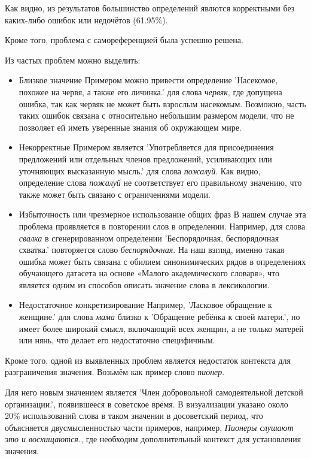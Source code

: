 \documentclass[LI,VKR]{HSEUniversity}
\begin{document}
Как видно, из результатов большинство определений явлются корректными
без каких-либо ошибок или недочётов (61.95\%).

Кроме того, проблема с самореференцией была успешно решена.

Из частых проблем можно выделить:
\begin{itemize}
    \item Близкое значение
Примером можно привести определение ’Насекомое, похожее на червя, а также его личинка.’
для слова \textit{червяк},
где допущена ошибка, так как червяк не может быть взрослым насекомым.
Возможно, часть таких ошибок связана с относительно небольшим размером модели,
что не позволяет ей иметь уверенные знания об окружающем мире.

    \item Некорректные
Примером является ’Употребляется для присоединения предложений или отдельных членов предложений,
усиливающих или уточняющих высказанную мысль.’
для слова \textit{пожалуй}.
Как видно, определение слова \textit{пожалуй} не соответствует его правильному значению,
что также может быть связано с ограничениями модели.

    \item Избыточность или чрезмерное использование общих фраз
В нашем случае эта проблема проявляется в повторении слов в определении.
Например, для слова \textit{свалка} в сгенерированном определении ’Беспорядочная, беспорядочная схватка.’
повторяется слово \textit{беспорядочная}.
На наш взгляд, именно такая ошибка может быть связана с обилием синонимических рядов в определениях
обучающего датасета на основе «Малого академического словаря»,
что является одним из способов описать значение слова в лексикологии.

    \item Недостаточное конкретизирование
Например, ’Ласковое обращение к женщине.’ для слова \textit{мама} близко к
’Обращение ребёнка к своей матери.’, но имеет более широкий смысл, включающий всех женщин,
а не только матерей или нянь, что делает его недостаточно специфичным. %
\end{itemize}

Кроме того, одной из выявленных проблем является недостаток контекста для разграничения значения.
Возьмём как пример слово \textit{пионер}.

Для него новым значением является ’Член добровольной самодеятельной детской организации.’,
появившееся в советское время.
В визуализации указано около 20\% использований слова в таком значении
в досоветский период, что объясняется двусмысленностью части примеров,
например, \textit{Пионеры слушают это и восхищаются.}, где необходим дополнительный контекст
для установления значения.
\end{document}
